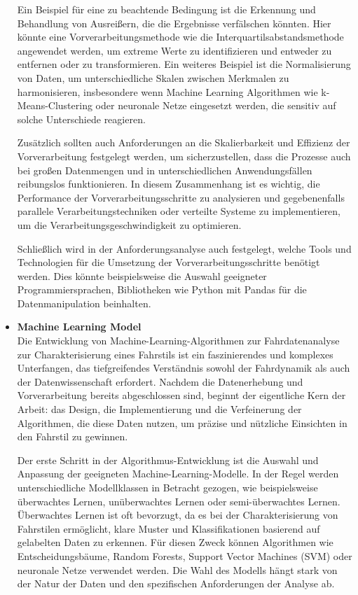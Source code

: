 \documentclass[oneside]{ausarbeitung}
\begin{document}
\begin{itemize}
  Ein Beispiel für eine zu beachtende Bedingung ist die Erkennung und Behandlung von Ausreißern, die die Ergebnisse verfälschen könnten. Hier könnte eine Vorverarbeitungsmethode wie die Interquartilsabstandsmethode angewendet werden, um extreme Werte zu identifizieren und entweder zu entfernen oder zu transformieren. Ein weiteres Beispiel ist die Normalisierung von Daten, um unterschiedliche Skalen zwischen Merkmalen zu harmonisieren, insbesondere wenn Machine Learning Algorithmen wie k-Means-Clustering oder neuronale Netze eingesetzt werden, die sensitiv auf solche Unterschiede reagieren.
  
  Zusätzlich sollten auch Anforderungen an die Skalierbarkeit und Effizienz der Vorverarbeitung festgelegt werden, um sicherzustellen, dass die Prozesse auch bei großen Datenmengen und in unterschiedlichen Anwendungsfällen reibungslos funktionieren. In diesem Zusammenhang ist es wichtig, die Performance der Vorverarbeitungsschritte zu analysieren und gegebenenfalls parallele Verarbeitungstechniken oder verteilte Systeme zu implementieren, um die Verarbeitungsgeschwindigkeit zu optimieren.
  
  Schließlich wird in der Anforderungsanalyse auch festgelegt, welche Tools und Technologien für die Umsetzung der Vorverarbeitungsschritte benötigt werden. Dies könnte beispielsweise die Auswahl geeigneter Programmiersprachen, Bibliotheken wie Python mit Pandas für die Datenmanipulation beinhalten.
  
  \item \textbf{Machine Learning Model}\\ Die Entwicklung von Machine-Learning-Algorithmen zur Fahrdatenanalyse zur Charakterisierung eines Fahrstils ist ein faszinierendes und komplexes Unterfangen, das tiefgreifendes Verständnis sowohl der Fahrdynamik als auch der Datenwissenschaft erfordert. Nachdem die Datenerhebung und Vorverarbeitung bereits abgeschlossen sind, beginnt der eigentliche Kern der Arbeit: das Design, die Implementierung und die Verfeinerung der Algorithmen, die diese Daten nutzen, um präzise und nützliche Einsichten in den Fahrstil zu gewinnen.
  
  Der erste Schritt in der Algorithmus-Entwicklung ist die Auswahl und Anpassung der geeigneten Machine-Learning-Modelle. In der Regel werden unterschiedliche Modellklassen in Betracht gezogen, wie beispielsweise überwachtes Lernen, unüberwachtes Lernen oder semi-überwachtes Lernen. Überwachtes Lernen ist oft bevorzugt, da es bei der Charakterisierung von Fahrstilen ermöglicht, klare Muster und Klassifikationen basierend auf gelabelten Daten zu erkennen. Für diesen Zweck können Algorithmen wie Entscheidungsbäume, Random Forests, Support Vector Machines (SVM) oder neuronale Netze verwendet werden. Die Wahl des Modells hängt stark von der Natur der Daten und den spezifischen Anforderungen der Analyse ab.
  

\end{itemize}
\end{document}
